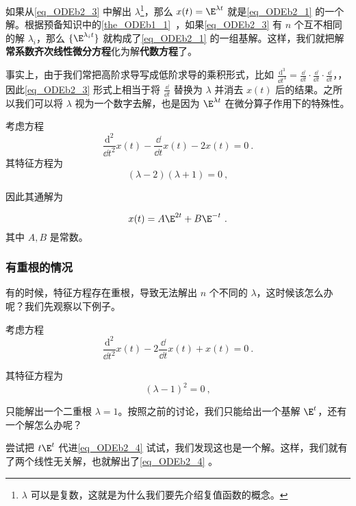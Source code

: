 如果从\autoref{eq_ODEb2_3} 中解出 $\lambda$\footnote{$\lambda$ 可以是复数，这就是为什么我们要先介绍复值函数的概念。}，那么 $x(t)=\E^{\lambda t}$ 就是\autoref{eq_ODEb2_1} 的一个解。根据预备知识中的\autoref{the_ODEb1_1}~，如果\autoref{eq_ODEb2_3} 有 $n$ 个互不相同的解 $\lambda_i$，那么 $\{\E^{\lambda_i t}\}$ 就构成了\autoref{eq_ODEb2_1} 的一组基解。这样，我们就把解\textbf{常系数齐次线性微分方程}化为解\textbf{代数方程}了。


事实上，由于我们常把高阶求导写成低阶求导的乘积形式，比如 $\frac{\mathrm{d}^3}{\dd t^3}=\frac{\dd }{\dd t}\cdot\frac{\dd }{\dd t}\cdot\frac{\dd }{\dd t}$，，因此\autoref{eq_ODEb2_3} 形式上相当于将 $\frac{\dd }{\dd t}$ 替换为 $\lambda$ 并消去 $x(t)$ 后的结果。之所以我们可以将 $\lambda$ 视为一个数字去解，也是因为 $\E^{\lambda t}$ 在微分算子作用下的特殊性。


\begin{example}{}
考虑方程
\begin{equation}
\frac{\mathrm{d}^2}{\dd t^2}x(t)-\frac{\dd }{\dd t}x(t)-2x(t)=0~.
\end{equation}
其特征方程为
\begin{equation}
(\lambda-2)(\lambda+1)=0~,
\end{equation}

因此其通解为

\begin{equation}
x(t)=A\E^{2t}+B\E^{-t}~.
\end{equation}
其中 $A, B$ 是常数。




\end{example}






\subsubsection{有重根的情况}



有的时候，特征方程存在重根，导致无法解出 $n$ 个不同的 $\lambda$，这时候该怎么办呢？我们先观察以下例子。

\begin{example}{}\label{ex_ODEb2_1}
考虑方程
\begin{equation}\label{eq_ODEb2_4}
\frac{\mathrm{d}^2}{\dd t^2}x(t)-2\frac{\dd }{\dd t}x(t)+x(t)=0~.
\end{equation}

其特征方程为
\begin{equation}
(\lambda-1)^2=0~,
\end{equation}

只能解出一个二重根 $\lambda=1$。按照之前的讨论，我们只能给出一个基解 $\E^{t}$，还有一个解怎么办呢？

尝试把 $t\E^{t}$ 代进\autoref{eq_ODEb2_4} 试试，我们发现这也是一个解。这样，我们就有了两个线性无关解，也就解出了\autoref{eq_ODEb2_4} 。




\end{example}




